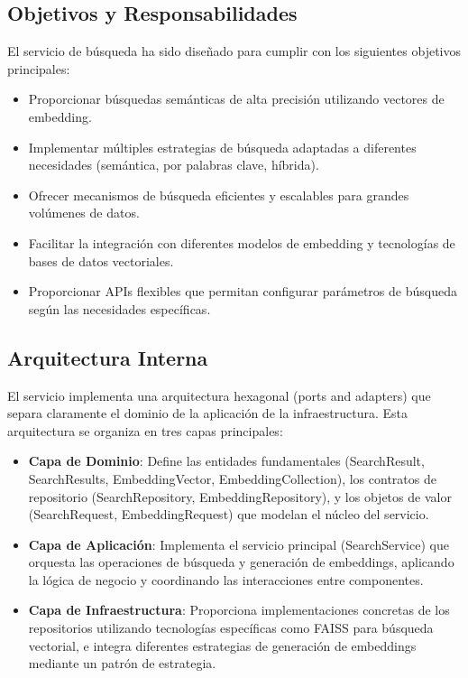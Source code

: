 \documentclass[12pt,a4paper]{article}
\begin{document}
\subsection{Objetivos y Responsabilidades}
\label{subsec:ss-objetivos}

El servicio de búsqueda ha sido diseñado para cumplir con los siguientes objetivos principales:

\begin{itemize}
    \item Proporcionar búsquedas semánticas de alta precisión utilizando vectores de embedding.
    
    \item Implementar múltiples estrategias de búsqueda adaptadas a diferentes necesidades (semántica, por palabras clave, híbrida).
    
    \item Ofrecer mecanismos de búsqueda eficientes y escalables para grandes volúmenes de datos.
    
    \item Facilitar la integración con diferentes modelos de embedding y tecnologías de bases de datos vectoriales.
    
    \item Proporcionar APIs flexibles que permitan configurar parámetros de búsqueda según las necesidades específicas.
\end{itemize}

\subsection{Arquitectura Interna}
\label{subsec:ss-arquitectura-interna}

El servicio implementa una arquitectura hexagonal (ports and adapters) que separa claramente el dominio de la aplicación de la infraestructura. Esta arquitectura se organiza en tres capas principales:

\begin{itemize}
    \item \textbf{Capa de Dominio}: Define las entidades fundamentales (SearchResult, SearchResults, EmbeddingVector, EmbeddingCollection), los contratos de repositorio (SearchRepository, EmbeddingRepository), y los objetos de valor (SearchRequest, EmbeddingRequest) que modelan el núcleo del servicio.
    
    \item \textbf{Capa de Aplicación}: Implementa el servicio principal (SearchService) que orquesta las operaciones de búsqueda y generación de embeddings, aplicando la lógica de negocio y coordinando las interacciones entre componentes.
    
    \item \textbf{Capa de Infraestructura}: Proporciona implementaciones concretas de los repositorios utilizando tecnologías específicas como FAISS para búsqueda vectorial, e integra diferentes estrategias de generación de embeddings mediante un patrón de estrategia.
\end{itemize}
\end{document}
